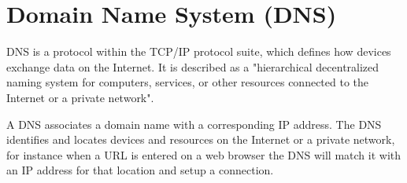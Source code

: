 \chapter{Domain Name System (DNS)}

DNS is a protocol within the TCP/IP protocol suite, which defines how devices exchange
data on the Internet. It is described as a "hierarchical decentralized
naming system for computers, services, or other resources connected to the
Internet or a private network"\textsuperscript{\cite{dnswiki}}.

\vspace{0.5cm}

A DNS associates a domain name with a corresponding IP address. The DNS
identifies and locates devices and resources on the Internet or a private
network, for instance when a URL is entered on a web browser the DNS will
match it with an IP address for that location and setup a connection.
